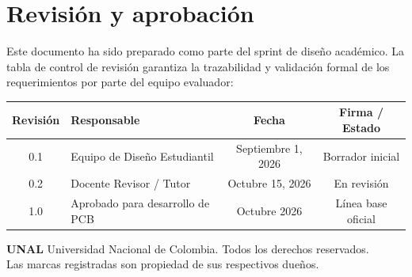\section*{Revisión y aprobación}

Este documento ha sido preparado como parte del sprint de diseño académico. La tabla de control de revisión garantiza la trazabilidad y validación formal de los requerimientos por parte del equipo evaluador:

\begin{table}[H]
\centering
\small
\begin{tabularx}{\textwidth}{|c X c c|}
\hline
\rowcolor{categorybg}
\textbf{Revisión} & \textbf{Responsable} & \textbf{Fecha} & \textbf{Firma / Estado} \\ \hline
0.1 & Equipo de Diseño Estudiantil & Septiembre 1, 2026 & Borrador inicial \\ \hline
0.2 & Docente Revisor / Tutor & Octubre 15, 2026 & En revisión \\ \hline
1.0 & Aprobado para desarrollo de PCB & Octubre 2026 & Línea base oficial \\ \hline
\end{tabularx}
\end{table}

\vspace{0.5cm}
\noindent
{\footnotesize \textbf{UNAL} Universidad Nacional de Colombia. Todos los derechos reservados.}\\
{\footnotesize Las marcas registradas son propiedad de sus respectivos dueños.}